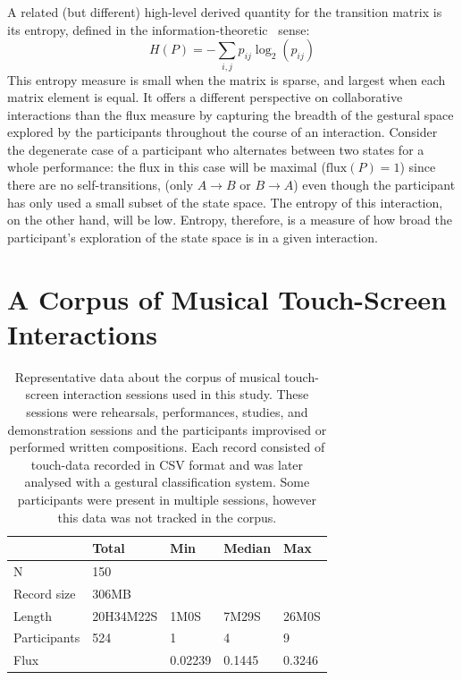 \documentclass{sigchi}
\begin{document}
A related (but different) high-level derived quantity for the
transition matrix is its entropy, defined in the
information-theoretic~\cite{Shannon:1948rt} sense:
\begin{equation}
  H(P) = -\sum_{i,j}p_{ij}\log_2(p_{ij})
\end{equation}
This entropy measure is small when the matrix is sparse, and largest
when each matrix element is equal. It offers a different perspective
on collaborative interactions than the flux measure by capturing the
breadth of the gestural space explored by the participants throughout
the course of an interaction. Consider the degenerate case of a
participant who alternates between two states for a whole performance:
the flux in this case will be maximal ($\mathrm{flux}(P) = 1$) since
there are no self-transitions, (only $A \rightarrow B$ or
$ B \rightarrow A$) even though the participant has only used a small
subset of the state space. The entropy of this interaction,
on the other hand, will be low. Entropy, therefore, is a measure of
how broad the participant's exploration of the state space is in a given
interaction.

\section{A Corpus of Musical Touch-Screen Interactions}

\begin{table}
\begin{tabular}{l|llll}
\hline
            & Total & Min  & Median   & Max     \\ 
\hline
N           & 150       &         &        &  \\
Record size & 306MB     &         &        &   \\
Length      & 20H34M22S & 1M0S    & 7M29S  & 26M0S\\
Participants& 524       & 1       & 4      & 9    \\
Flux        &           & 0.02239 & 0.1445 & 0.3246\\
\hline
\end{tabular}
\caption{
  Representative data about the corpus of musical touch-screen
  interaction sessions used in this study. These sessions were
  rehearsals, performances, studies, and demonstration sessions and the
  participants improvised or performed written compositions. Each record
  consisted of touch-data recorded in CSV format and was later analysed
  with a gestural classification system. Some participants were
  present in multiple sessions, however this data was not tracked in
  the corpus.\label{corpus-table}}
\end{table}
\end{document}
